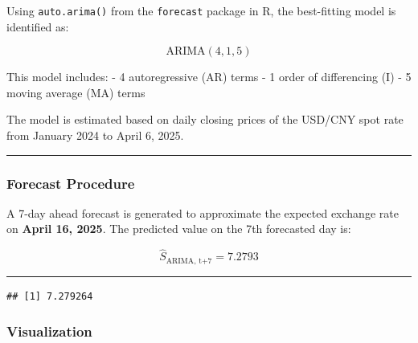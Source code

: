 \documentclass[
]{article}
\newenvironment{Shaded}{\begin{snugshade}}{\end{snugshade}}
\newcommand{\AttributeTok}[1]{\textcolor[rgb]{0.13,0.29,0.53}{#1}}
\newcommand{\DecValTok}[1]{\textcolor[rgb]{0.00,0.00,0.81}{#1}}
\newcommand{\FunctionTok}[1]{\textcolor[rgb]{0.13,0.29,0.53}{\textbf{#1}}}
\newcommand{\NormalTok}[1]{#1}
\newcommand{\OtherTok}[1]{\textcolor[rgb]{0.56,0.35,0.01}{#1}}
\newcommand{\SpecialCharTok}[1]{\textcolor[rgb]{0.81,0.36,0.00}{\textbf{#1}}}
\begin{document}
Using \texttt{auto.arima()} from the \texttt{forecast} package in R, the
best-fitting model is identified as:

\[
\text{ARIMA}(4,1,5)
\]

This model includes: - 4 autoregressive (AR) terms - 1 order of
differencing (I) - 5 moving average (MA) terms

The model is estimated based on daily closing prices of the USD/CNY spot
rate from January 2024 to April 6, 2025.

\begin{center}\rule{0.5\linewidth}{0.5pt}\end{center}

\subsubsection{Forecast Procedure}\label{forecast-procedure}

A 7-day ahead forecast is generated to approximate the expected exchange
rate on \textbf{April 16, 2025}. The predicted value on the 7th
forecasted day is:

\[
\hat{S}_{\text{ARIMA, t+7}} = \mathbf{7.2793}
\]

\begin{center}\rule{0.5\linewidth}{0.5pt}\end{center}

\begin{Shaded}
\end{Shaded}

\begin{verbatim}
## [1] 7.279264
\end{verbatim}

\subsubsection{Visualization}\label{visualization}
\end{document}
